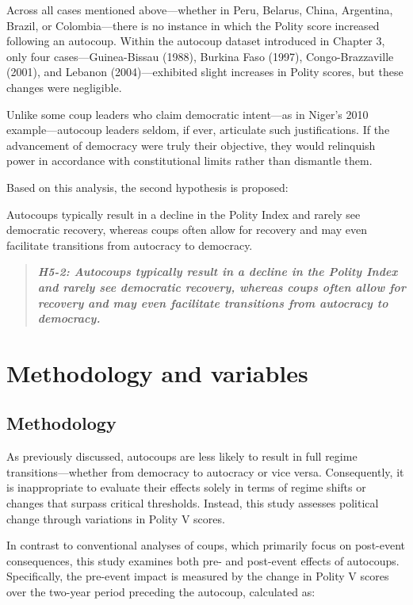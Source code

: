 \documentclass[
  12pt,
]{report}
\begin{document}
Across all cases mentioned above---whether in Peru, Belarus, China,
Argentina, Brazil, or Colombia---there is no instance in which the
Polity score increased following an autocoup. Within the autocoup
dataset introduced in Chapter 3, only four cases---Guinea-Bissau (1988),
Burkina Faso (1997), Congo-Brazzaville (2001), and Lebanon
(2004)---exhibited slight increases in Polity scores, but these changes
were negligible.

Unlike some coup leaders who claim democratic intent---as in Niger's
2010 example---autocoup leaders seldom, if ever, articulate such
justifications. If the advancement of democracy were truly their
objective, they would relinquish power in accordance with constitutional
limits rather than dismantle them.

Based on this analysis, the second hypothesis is proposed:

Autocoups typically result in a decline in the Polity Index and rarely
see democratic recovery, whereas coups often allow for recovery and may
even facilitate transitions from autocracy to democracy.

\begin{quote}
\textbf{\emph{H5-2: Autocoups typically result in a decline in the
Polity Index and rarely see democratic recovery, whereas coups often
allow for recovery and may even facilitate transitions from autocracy to
democracy.}}
\end{quote}

\section{Methodology and variables}\label{methodology-and-variables}

\subsection*{Methodology}\label{methodology-1}

As previously discussed, autocoups are less likely to result in full
regime transitions---whether from democracy to autocracy or vice versa.
Consequently, it is inappropriate to evaluate their effects solely in
terms of regime shifts or changes that surpass critical thresholds.
Instead, this study assesses political change through variations in
Polity V scores.

In contrast to conventional analyses of coups, which primarily focus on
post-event consequences, this study examines both pre- and post-event
effects of autocoups. Specifically, the pre-event impact is measured by
the change in Polity V scores over the two-year period preceding the
autocoup, calculated as:
\end{document}
